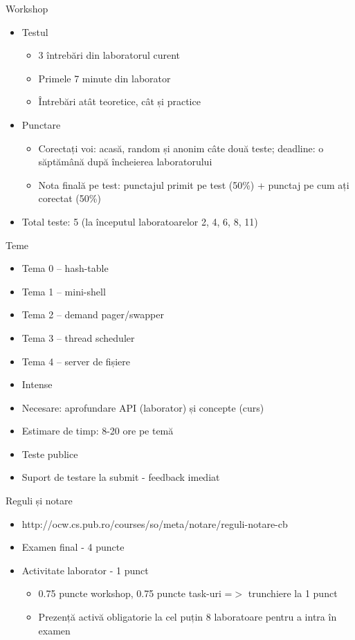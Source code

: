 \documentclass{so.cs.pub.ro}
\begin{document}
\begin{frame}{Workshop}
  	\begin{itemize}   
    		\item Testul
		\begin{itemize}
			\item 3 întrebări din laboratorul curent
			\item Primele 7 minute din laborator
			\item Întrebări atât teoretice, cât și practice
		\end{itemize}
		\item Punctare
		\begin{itemize}
			\item Corectați voi: acasă, random și anonim câte două teste; deadline: o săptămână după încheierea laboratorului
			\item Nota finală pe test: punctajul primit pe test (50\%) + punctaj pe cum ați corectat (50\%)
		\end{itemize}
		\item Total teste: 5 (la începutul laboratoarelor 2, 4, 6, 8, 11)
    	\end{itemize}		
\end{frame}

\begin{frame}{Teme}
  	\begin{itemize}   
    		\item Tema 0 – hash-table
		\item Tema 1 – mini-shell
		\item Tema 2 – demand pager/swapper
		\item Tema 3 – thread scheduler
		\item Tema 4 – server de fișiere
		\vspace*{0.2cm}
		\item Intense
		\item Necesare: aprofundare API (laborator) și concepte (curs)
		\item Estimare de timp: 8-20 ore pe temă
		\item Teste publice
		\item Suport de testare la submit - feedback imediat
    	\end{itemize}		
\end{frame}

\begin{frame}{Reguli și notare}
  	\begin{itemize}
        \item http://ocw.cs.pub.ro/courses/so/meta/notare/reguli-notare-cb  
		\item Examen final - 4 puncte
    		\item Activitate laborator - 1 punct
		\begin{itemize}
			\item 0.75 puncte workshop, 0.75 puncte task-uri =$>$ trunchiere la 1 punct
			\item Prezență activă obligatorie la cel puțin 8 laboratoare pentru a intra în examen
		\end{itemize}
	\end{itemize}
\end{frame}
\end{document}
